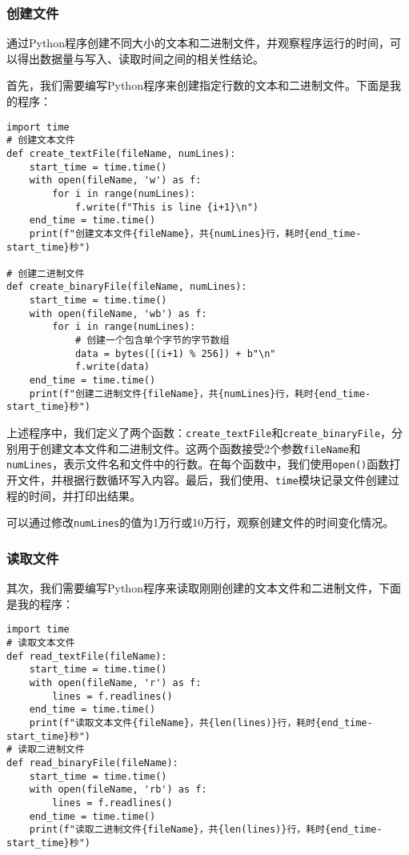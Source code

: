 \documentclass[lang=cn,11pt,a4paper]{elegantpaper}
\begin{document}
\subsubsection{创建文件}
通过Python程序创建不同大小的文本和二进制文件，并观察程序运行的时间，可以得出数据量与写入、读取时间之间的相关性结论。

首先，我们需要编写Python程序来创建指定行数的文本和二进制文件。下面是我的程序：

\begin{lstlisting}
import time
# 创建文本文件
def create_textFile(fileName, numLines):
    start_time = time.time()
    with open(fileName, 'w') as f:
        for i in range(numLines):
            f.write(f"This is line {i+1}\n")
    end_time = time.time()
    print(f"创建文本文件{fileName}，共{numLines}行，耗时{end_time-start_time}秒")

# 创建二进制文件
def create_binaryFile(fileName, numLines):
    start_time = time.time()
    with open(fileName, 'wb') as f:
        for i in range(numLines):
            # 创建一个包含单个字节的字节数组
            data = bytes([(i+1) % 256]) + b"\n"
            f.write(data)
    end_time = time.time()
    print(f"创建二进制文件{fileName}，共{numLines}行，耗时{end_time-start_time}秒")

\end{lstlisting}

上述程序中，我们定义了两个函数：\lstinline{create_textFile}和\lstinline{create_binaryFile}，分别用于创建文本文件和二进制文件。这两个函数接受2个参数\lstinline{fileName}和\lstinline{numLines}，表示文件名和文件中的行数。在每个函数中，我们使用\lstinline{open()}函数打开文件，并根据行数循环写入内容。最后，我们使用、\lstinline{time}模块记录文件创建过程的时间，并打印出结果。

可以通过修改\lstinline{numLines}的值为1万行或10万行，观察创建文件的时间变化情况。

\subsubsection{读取文件}

其次，我们需要编写Python程序来读取刚刚创建的文本文件和二进制文件，下面是我的程序：
\begin{lstlisting}
import time
# 读取文本文件
def read_textFile(fileName):
    start_time = time.time()
    with open(fileName, 'r') as f:
        lines = f.readlines()
    end_time = time.time()
    print(f"读取文本文件{fileName}，共{len(lines)}行，耗时{end_time-start_time}秒")
# 读取二进制文件
def read_binaryFile(fileName):
    start_time = time.time()
    with open(fileName, 'rb') as f:
        lines = f.readlines()
    end_time = time.time()
    print(f"读取二进制文件{fileName}，共{len(lines)}行，耗时{end_time-start_time}秒")
\end{lstlisting}
\end{document}
